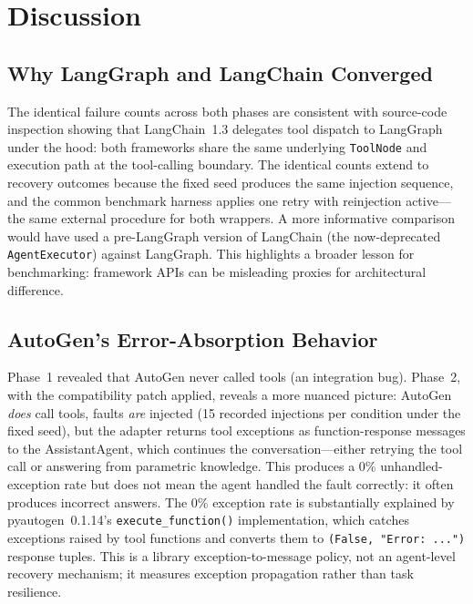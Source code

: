 \documentclass[make,article,submit,moreauthors,pdftex]{mdpi}
\begin{document}
\section{Discussion}\label{sec:discussion}

\subsection{Why LangGraph and LangChain Converged}\label{sec:lg-lc-convergence}

{\color{orange!80!black}The identical failure counts across both phases are consistent with source-code inspection showing that LangChain~1.3 delegates tool dispatch to LangGraph under the hood: both frameworks share the same underlying \texttt{ToolNode} and execution path at the tool-calling boundary. The identical counts extend to recovery outcomes because the fixed seed produces the same injection sequence, and the common benchmark harness applies one retry with reinjection active---the same external procedure for both wrappers. A more informative comparison would have used a pre-LangGraph version of LangChain (the now-deprecated \texttt{AgentExecutor}) against LangGraph. This highlights a broader lesson for benchmarking: framework APIs can be misleading proxies for architectural difference.}

\subsection{AutoGen's Error-Absorption Behavior}

Phase~1 revealed that AutoGen never called tools (an integration bug). Phase~2, with the compatibility patch applied, reveals a more nuanced picture: AutoGen \emph{does} call tools, faults \emph{are} injected (15 recorded injections per condition under the fixed seed), but the adapter returns tool exceptions as function-response messages to the AssistantAgent, which continues the conversation---either retrying the tool call or answering from parametric knowledge. This produces a 0\% unhandled-exception rate but does not mean the agent handled the fault correctly: it often produces incorrect answers. The 0\% exception rate is substantially explained by pyautogen~0.1.14's \texttt{execute\_function()} implementation, which catches exceptions raised by tool functions and converts them to \texttt{(False, "Error:~...")} response tuples. This is a library exception-to-message policy, not an agent-level recovery mechanism; it measures exception propagation rather than task resilience.
\end{document}

